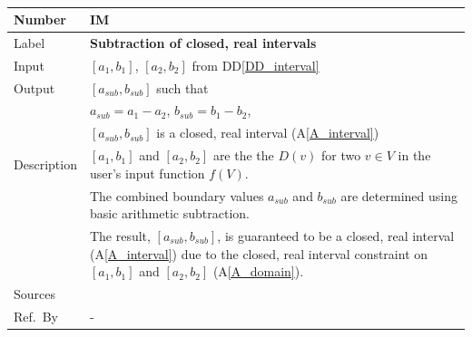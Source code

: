 \documentclass[12pt]{article}
\newcommand{\colAwidth}{0.13\textwidth}
\newcommand{\colBwidth}{0.82\textwidth}
\newcommand{\ddref}[1]{DD\ref{#1}}
\newcommand{\aref}[1]{A\ref{#1}}
\newcounter{instnum} %
\begin{document}
~\newline

\noindent
\begin{minipage}{\textwidth}
	\renewcommand*{\arraystretch}{1.5}
	\begin{tabular}{| p{\colAwidth} | p{\colBwidth}|}
		\hline
		\rowcolor[gray]{0.9}
		Number& IM{instnum}\theinstnum \label{I_subtraction}\\
		\hline
		Label& \bf Subtraction of closed, real intervals\\
		\hline
		Input&$[a_{1}, b_{1}]$, $[a_{2}, b_{2}]$ from \ddref{DD_interval}\\
		\hline
		Output&$[a_{sub}, b_{sub}]$ such that\\
		&$a_{sub} = a_{1} - a_{2}$, $b_{sub} = b_{1} - b_{2}$,\\
		&$[a_{sub}, b_{sub}]$ is a closed, real interval (\aref{A_interval}) \\
		\hline
		Description&$[a_{1}, b_{1}]$ and $[a_{2}, b_{2}]$ are the the $D(v)$ 
		for two $v \in V$ in the user's input function $f(V)$. \\
		&The combined boundary values $a_{sub}$ and  $b_{sub}$ are determined 
		using basic arithmetic subtraction.\\
		& The result, $[a_{sub}, b_{sub}]$, is guaranteed to be a closed, real 
		interval (\aref{A_interval}) due to the closed, real interval 
		constraint on $[a_{1}, b_{1}]$ and $[a_{2}, b_{2}]$ (\aref{A_domain}).
		\\
		\hline
		Sources& ~\cite{intervalarithmetic} \ \\
		\hline
		Ref.\ By & -\\
		\hline
	\end{tabular}
\end{minipage}\\

~\newline
\end{document}
